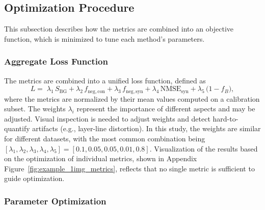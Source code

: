 \documentclass[journal,article,submit,moreauthors]{Definitions/mdpi}
\begin{document}
\subsection{Optimization Procedure}
\label{sec:optimization_procedure}

This subsection describes how the metrics are combined into an objective function, which is minimized to tune each method's parameters.

\subsubsection{Aggregate Loss Function}

The metrics are combined into a unified loss function, defined as
\begin{equation}
L =\;
\lambda_1\, S_{\mathrm{BG}}
+ \lambda_2\, f_{\mathrm{neg,con}}
+ \lambda_3\, f_{\mathrm{neg,syn}}
+ \lambda_4\, \mathrm{NMSE}_{\mathrm{syn}}
+ \lambda_5\, \bigl(1 - f_{B}\bigr),
\end{equation}
where the metrics are normalized by their mean values computed on a calibration subset. The weights $\lambda_i$ represent the importance of different aspects and may be adjusted. Visual inspection is needed to adjust weights and detect hard-to-quantify artifacts (e.g., layer-line distortion). In this study, the weights are similar for different datasets, with the most common combination being $[\lambda_1, \lambda_2, \lambda_3, \lambda_4, \lambda_5] = [0.1, 0.05, 0.05, 0.01, 0.8]$. Visualization of the results based on the optimization of individual metrics, shown in Appendix Figure~\ref{fig:example_1img_metrics}, reflects that no single metric is sufficient to guide optimization.

\subsubsection{Parameter Optimization}
\end{document}

